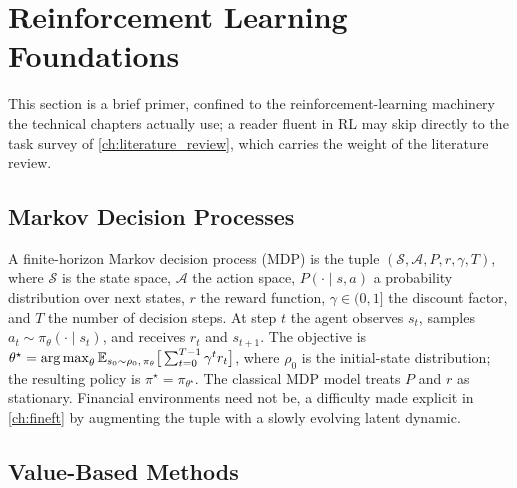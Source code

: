 \section{Reinforcement Learning Foundations}
\label{sec:bg_rl}

This section is a brief primer, confined to the reinforcement-learning machinery the technical chapters actually use; a reader fluent in RL may skip directly to the task survey of \cref{ch:literature_review}, which carries the weight of the literature review.

\subsection{Markov Decision Processes}
\label{sec:bg_mdp}

A finite-horizon Markov decision process (MDP) is the tuple $(\mathcal{S},\mathcal{A},P,r,\gamma,T)$, where $\mathcal{S}$ is the state space, $\mathcal{A}$ the action space, $P(\cdot\mid s,a)$ a probability distribution over next states, $r$ the reward function, $\gamma\in(0,1]$ the discount factor, and $T$ the number of decision steps. At step $t$ the agent observes $s_t$, samples $a_t\sim\pi_\theta(\cdot\mid s_t)$, and receives $r_t$ and $s_{t+1}$. The objective is $\theta^\star=\operatorname*{arg\,max}_\theta \mathbb{E}_{s_0\sim\rho_0,\,\pi_\theta}\big[\sum_{t=0}^{T-1}\gamma^t r_t\big]$, where $\rho_0$ is the initial-state distribution; the resulting policy is $\pi^\star=\pi_{\theta^\star}$. The classical MDP model treats $P$ and $r$ as stationary. Financial environments need not be, a difficulty made explicit in \cref{ch:fineft} by augmenting the tuple with a slowly evolving latent dynamic.

\subsection{Value-Based Methods}
\label{sec:bg_value}


